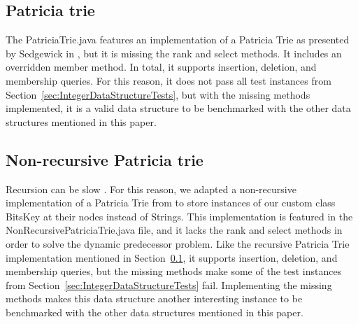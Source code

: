 \subsection{Patricia trie} \label{sec:PatriciaTrieImplementation}

The {\ttfamily PatriciaTrie.java} features an implementation of a Patricia Trie as presented by Sedgewick in \cite{sedgewick2002algorithms}, but it is missing the {\ttfamily rank} and {\ttfamily select} methods. It includes an overridden {\ttfamily member} method. In total, it supports insertion, deletion, and membership queries. For this reason, it does not pass all test instances from Section~\ref{sec:IntegerDataStructureTests}, but with the missing methods implemented, it is a valid data structure to be benchmarked with the other data structures mentioned in this paper.

\subsection{Non-recursive Patricia trie}

Recursion can be slow \cite{shirazi2003java}. For this reason, we adapted a non-recursive implementation of a Patricia Trie from \cite{patriciaSET} to store instances of our custom class {\ttfamily BitsKey} at their nodes instead of {\ttfamily String}s. This implementation is featured in the {\ttfamily NonRecursivePatriciaTrie.java} file, and it lacks the {\ttfamily rank} and {\ttfamily select} methods in order to solve the dynamic predecessor problem. Like the recursive Patricia Trie implementation mentioned in Section~\ref{sec:PatriciaTrieImplementation}, it supports insertion, deletion, and membership queries, but the missing methods make some of the test instances from Section~\ref{sec:IntegerDataStructureTests} fail. Implementing the missing methods makes this data structure another interesting instance to be benchmarked with the other data structures mentioned in this paper.